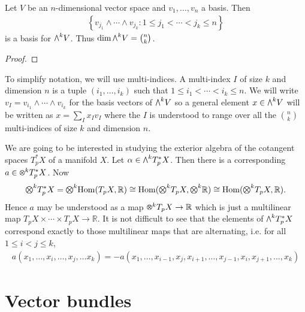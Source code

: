 \documentclass{article}
\begin{document}
\begin{lemma}
  Let $V$ be an $n$-dimensional vector space and $v_1,\ldots,v_n$ a basis.
  Then
  \begin{align*}
    \left\lbrace{v_{j_1}\wedge\cdots\wedge v_{j_k} : 1\leq j_1<\cdots<j_k\leq n }\right\rbrace
  \end{align*}
  is a basis for $\exterior{k}{V}$. Thus $\dim\exterior{k}{V} = \binom{n}{k}$.
  \begin{proof}
  \end{proof}
\end{lemma}

To simplify notation, we will use multi-indices. A multi-index $I$ of size
$k$ and dimension $n$ is a tuple $(i_1,\ldots,i_k)$ such that
$1\leq i_1<\cdots<i_k\leq n$. We will write $v_I = v_{i_1}\wedge \cdots \wedge
v_{i_k}$ for the basis vectors of $\exterior{k}{V}$ so a general
element $x\in\exterior{k}{V}$ will be written as
$x = \sum_I x_I v_I$ where the $I$ is understood to range over
all the $\binom{n}{k}$ multi-indices of size $k$ and dimension $n$.

\begin{example}
  We are going to be interested in studying the exterior
  algebra of the cotangent spaces $T_p^* X$ of a manifold $X$.
  Let $\alpha\in \exterior{k}{T^*_p X}$. Then there is a corresponding $a\in
  \tensor{k}{T_p^* X}$. Now
  \begin{align*}
    \tensor{k}{T_p^* X} = \tensor{k}{\Hom(T_p X,\mathbb{R})} \cong \Hom(\tensor{k}{T_p X}, \tensor{k}{\mathbb{R}}) \cong \Hom(\tensor{k}{T_p X},\mathbb{R}).
  \end{align*}
  Hence $a$ may be understood as a map $\tensor{k}{T_p X}\to\mathbb{R}$
  which is just a multilinear map $T_p X\times\cdots\times T_p X\to\mathbb{R}$. It is not difficult to see that the elements of $\exterior{k}{T^*_p X}$
  correspond exactly to those multilinear maps that are alternating,
  i.e. for all $1\leq i < j\leq k$,
  \begin{align*}
    a(x_1,\ldots,x_i,\ldots,x_j,\ldots x_k) = -a(x_1,\ldots,x_{i-1},x_j,x_{i+1},\ldots,x_{j-1},x_i,x_{j+1},\ldots,x_k)
  \end{align*}
\end{example}

\section{Vector bundles}
\end{document}
